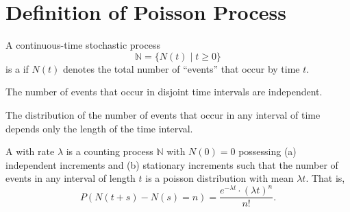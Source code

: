 \section{Definition of Poisson Process}

A continuous-time stochastic process
\[ \mathbb{N} = \{ N(t) \mid t \ge 0 \} \]
is a  if $ N(t) $ denotes the total number of ``events'' that occur by time $ t $.
\begin{comment}
$ N(t) $: non-negative integer, increases as $ t $ increases.
\end{comment}

\begin{definition} \label{def:independent}
The number of events that occur in disjoint time intervals are independent.
\end{definition}

\begin{definition} \label{def:stationary}
The distribution of the number of events that occur in any interval of time depends only the length of the time interval.
\end{definition}

\begin{definition}
A  with rate $ \lambda $ is a counting process $ \mathbb{N} $ with $ N(0) = 0 $ possessing (a) independent increments and (b) stationary increments such that the number of events in any interval of length $ t $ is a poisson distribution with mean $ \lambda t $. That is,
\[ P(N(t + s) - N(s) = n) = \frac{e^{-\lambda t} \cdot (\lambda t)^{n}}{n!}. \]
\end{definition}

